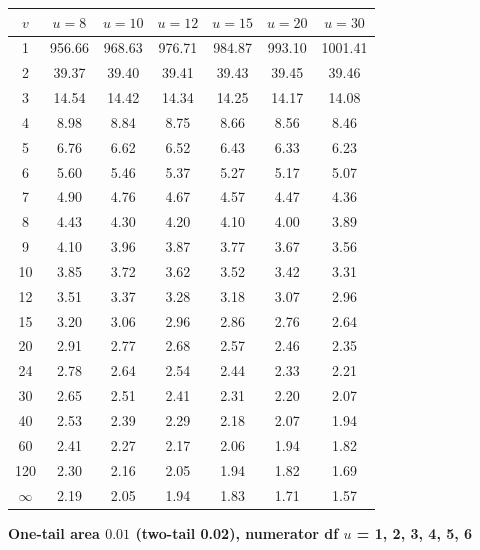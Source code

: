 \begin{center}
\small
\begin{tabular}{c|cccccc}
\toprule
$v$ & $u=8$ & $u=10$ & $u=12$ & $u=15$ & $u=20$ & $u=30$ \\
\midrule
1 & 956.66 & 968.63 & 976.71 & 984.87 & 993.10 & 1001.41 \\
2 & 39.37 & 39.40 & 39.41 & 39.43 & 39.45 & 39.46 \\
3 & 14.54 & 14.42 & 14.34 & 14.25 & 14.17 & 14.08 \\
4 & 8.98 & 8.84 & 8.75 & 8.66 & 8.56 & 8.46 \\
5 & 6.76 & 6.62 & 6.52 & 6.43 & 6.33 & 6.23 \\
6 & 5.60 & 5.46 & 5.37 & 5.27 & 5.17 & 5.07 \\
7 & 4.90 & 4.76 & 4.67 & 4.57 & 4.47 & 4.36 \\
8 & 4.43 & 4.30 & 4.20 & 4.10 & 4.00 & 3.89 \\
9 & 4.10 & 3.96 & 3.87 & 3.77 & 3.67 & 3.56 \\
10 & 3.85 & 3.72 & 3.62 & 3.52 & 3.42 & 3.31 \\
12 & 3.51 & 3.37 & 3.28 & 3.18 & 3.07 & 2.96 \\
15 & 3.20 & 3.06 & 2.96 & 2.86 & 2.76 & 2.64 \\
20 & 2.91 & 2.77 & 2.68 & 2.57 & 2.46 & 2.35 \\
24 & 2.78 & 2.64 & 2.54 & 2.44 & 2.33 & 2.21 \\
30 & 2.65 & 2.51 & 2.41 & 2.31 & 2.20 & 2.07 \\
40 & 2.53 & 2.39 & 2.29 & 2.18 & 2.07 & 1.94 \\
60 & 2.41 & 2.27 & 2.17 & 2.06 & 1.94 & 1.82 \\
120 & 2.30 & 2.16 & 2.05 & 1.94 & 1.82 & 1.69 \\
$\infty$ & 2.19 & 2.05 & 1.94 & 1.83 & 1.71 & 1.57 \\
\bottomrule
\end{tabular}
\end{center}

\textbf{One-tail area $0.01$ (two-tail 0.02), numerator df $u$ = 1, 2, 3, 4, 5, 6}

